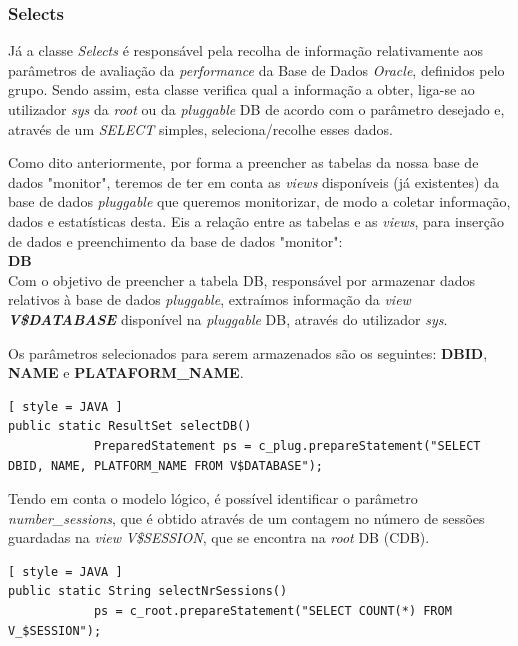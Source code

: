 \documentclass[a4paper]{article}
\begin{document}
\subsubsection{Selects}
\label{selects}
\hspace{3mm} 

Já a classe \emph{Selects} é responsável pela recolha de informação relativamente aos parâmetros de avaliação da \emph{performance} da Base de Dados \emph{Oracle}, definidos pelo grupo. Sendo assim, esta classe verifica qual a informação a obter, liga-se ao utilizador \emph{sys} da \emph{root} ou da \emph{pluggable} DB de acordo com o parâmetro desejado e, através de um \emph{SELECT} simples, seleciona/recolhe esses dados.

Como dito anteriormente, por forma a preencher as tabelas da nossa base de dados "monitor", teremos de ter em conta as \emph{views} disponíveis (já existentes) da base de dados \emph{pluggable} que queremos monitorizar, de modo a coletar informação, dados e estatísticas desta.
Eis a relação entre as tabelas e as \emph{views}, para inserção de dados e preenchimento da base de dados "monitor":\\

\textbf{\large DB}\\

Com o objetivo de preencher a tabela DB, responsável por armazenar dados relativos à base de dados \emph{pluggable}, extraímos informação da \emph{view} \textbf{\emph{V\$DATABASE}} disponível na \emph{pluggable} DB, através do utilizador \emph{sys}.

Os parâmetros selecionados para serem armazenados são os seguintes: \textbf{DBID}, \textbf{NAME} e \textbf{PLATAFORM\_NAME}.\\

\begin{lstlisting}[ style = JAVA ]
public static ResultSet selectDB() 
            PreparedStatement ps = c_plug.prepareStatement("SELECT DBID, NAME, PLATFORM_NAME FROM V$DATABASE");

\end{lstlisting}

Tendo em conta o modelo lógico, é possível identificar o parâmetro \emph{number\_sessions}, que é obtido através de um contagem no número de sessões guardadas na \emph{view} \emph{V\$SESSION}, que se encontra na \emph{root} DB (CDB).


\begin{lstlisting}[ style = JAVA ]
public static String selectNrSessions() 
            ps = c_root.prepareStatement("SELECT COUNT(*) FROM V_$SESSION");

\end{lstlisting}
\end{document}
